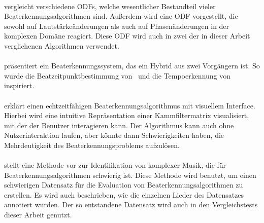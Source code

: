 \paragraph{\cite{2004_BeDaDuSa}}
{
	vergleicht verschiedene \acp{ODF},
		welche wesentlicher Bestandteil vieler Beaterkennungsalgorithmen sind.
	Au{\ss}erdem wird eine \ac{ODF} vorgestellt,
		die sowohl auf Lautstärkeänderungen
		als auch auf Phasenänderungen in der komplexen Domäne
		reagiert.
	Diese \ac{ODF} wird auch in zwei der in dieser Arbeit verglichenen Algorithmen verwendet.
}

\paragraph{\cite{2009_DaPlSt}}
{
	präsentiert ein Beaterkennungssystem,
		das ein Hybrid aus zwei Vorgängern ist.
	So wurde die Beatzeitpunktbestimmung von~\cite{2007_El}
		und die Tempoerkennung von~\cite{2007_DaPl} inspiriert.
}

\paragraph{\cite{2011_PlRoSt}}
{
	erklärt einen echtzeitfähigen Beaterkennungsalgorithmus mit visuellem Interface.
	Hierbei wird eine intuitive Repräsentation einer Kammfiltermatrix visualisiert,
		mit der der Benutzer interagieren kann.
	Der Algorithmus kann auch ohne Nutzerinteraktion laufen,
		aber könnte dann Schwierigkeiten haben,
		die Mehrdeutigkeit des Beaterkennungsproblems aufzulösen.
}


\paragraph{\cite{2012_HoDaZaOlGo}}
{
	stellt eine Methode vor zur Identifikation von komplexer Musik,
		die für Beaterkennungsalgorithmen schwierig ist.
	Diese Methode wird benutzt,
		um einen schwierigen Datensatz für die Evaluation von Beaterkennungsalgorithmen zu erstellen.
	Es wird auch beschrieben,
		wie die einzelnen Lieder des Datensatzes annotiert wurden.
	Der so entstandene Datensatz wird auch in den Vergleichstests dieser Arbeit genutzt.
}
